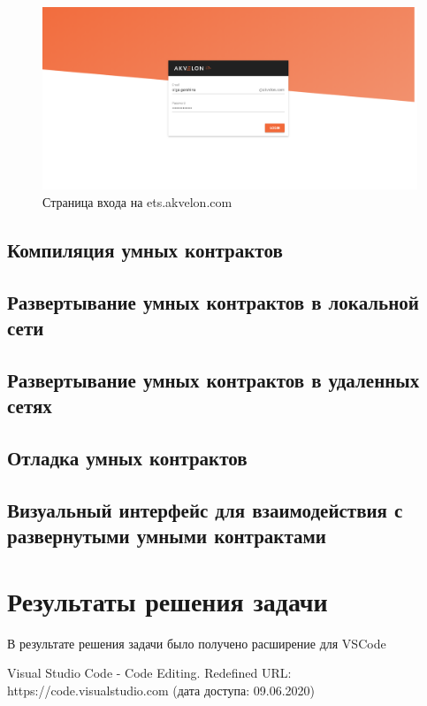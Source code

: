 \documentclass[a4paper,12pt]{diplom}
\begin{document}
\begin{figure}[!ht]
	\centering
	\includegraphics[width=1\textwidth]{resources/ets.png}
	\caption{Страница входа на ets.akvelon.com}
	\label{fig:1}
\end{figure}


\section{Компиляция умных контрактов}

\section{Развертывание умных контрактов в локальной сети}

\section{Развертывание умных контрактов в удаленных сетях}

\section{Отладка умных контрактов}

\section{Визуальный интерфейс для взаимодействия с развернутыми умными контрактами}

\chapter{Результаты решения задачи}

В результате решения задачи было получено расширение для VSCode


\renewcommand{\bibname}{Список литературы} 
\begin{thebibliography}{9}

Visual Studio Code - Code Editing. Redefined
URL: https://code.visualstudio.com
(дата доступа: 09.06.2020)

\end{thebibliography}
\end{document}
